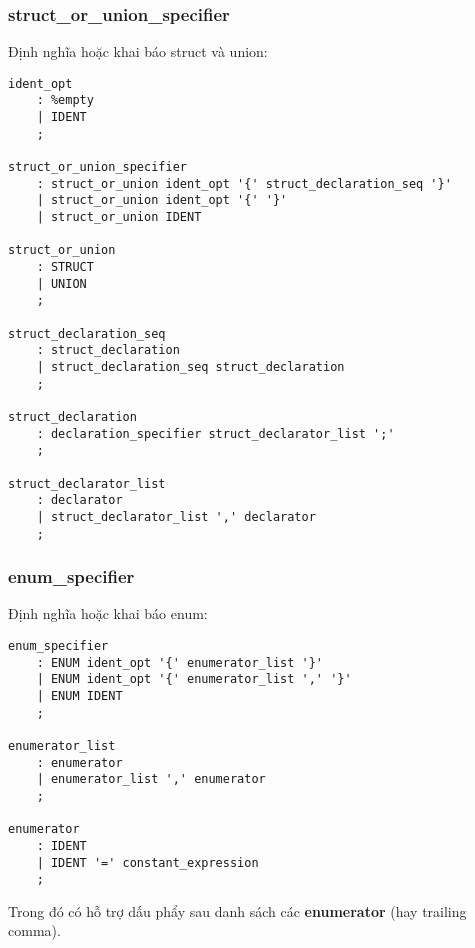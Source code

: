 \documentclass[../report.tex]{subfiles}
\begin{document}
\subsubsection{struct\_or\_union\_specifier}
Định nghĩa hoặc khai báo struct và union:
\begin{lstlisting}
ident_opt
    : %empty
    | IDENT
    ;

struct_or_union_specifier
    : struct_or_union ident_opt '{' struct_declaration_seq '}'
    | struct_or_union ident_opt '{' '}'
    | struct_or_union IDENT

struct_or_union
    : STRUCT
    | UNION
    ;

struct_declaration_seq
    : struct_declaration
    | struct_declaration_seq struct_declaration
    ;

struct_declaration
    : declaration_specifier struct_declarator_list ';' 
    ;

struct_declarator_list
    : declarator
    | struct_declarator_list ',' declarator
    ;
\end{lstlisting}

\subsubsection{enum\_specifier}
Định nghĩa hoặc khai báo enum:
\begin{lstlisting}
enum_specifier
    : ENUM ident_opt '{' enumerator_list '}'
    | ENUM ident_opt '{' enumerator_list ',' '}'
    | ENUM IDENT
    ;

enumerator_list
    : enumerator
    | enumerator_list ',' enumerator
    ;

enumerator
    : IDENT 
    | IDENT '=' constant_expression
    ;
\end{lstlisting}
Trong đó có hỗ trợ dấu phẩy sau danh sách các \textbf{enumerator} 
(hay trailing comma). \\
\end{document}
